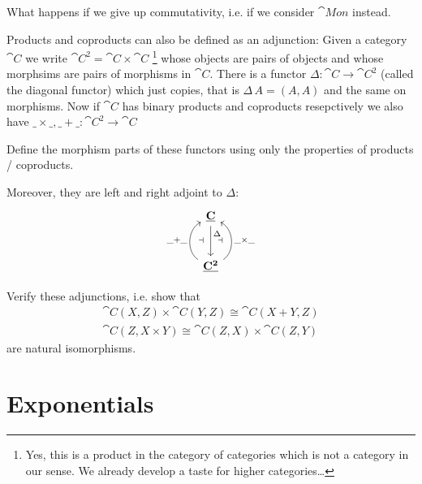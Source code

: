 \begin{question}
  What happens if we give up commutativity, i.e. if we consider $\cat{Mon}$ instead.
\end{question}

Products and coproducts can also be defined as an adjunction: Given a category $\cat{C}$ we write $\cat{C^2} = \cat{C}\times\cat{C}$
\footnote{Yes, this is a product in the category of categories which is not a category in our sense. We already develop a taste for higher categories\dots}
whose objects are pairs of objects and whose morphsims are pairs of morphisms in $\cat{C}$. There is a functor $\Delta : \cat{C} \to \cat{C^2}$ (called the diagonal functor) which just copies, that is $\Delta\,A = (A,A)$ and the same on morphisms. Now if $\cat{C}$ has binary products and coproducts resepctively we also have $\_\times\_, \_+\_ : \cat{C^2} \to \cat{C}$
\begin{Exercise}
  Define the morphism parts of these functors using only the properties of products / coproducts.
\end{Exercise}
Moreover, they are left and right adjoint to $\Delta$:
\[\begin{tikzcd}[row sep=large]
\cat{C} \arrow[d,"\Delta" near start] \\ 
\cat{C^2} \arrow[u,bend left = 60,"\_+\_" left,"\dashv" right=5 ] \arrow[u,bend right = 60,"\_\times\_" right,"\dashv" left = 5]
\end{tikzcd}\]
\begin{Exercise}
  Verify these adjunctions, i.e. show that
  \begin{align*}
    \cat{C}(X,Z) \times \cat{C}(Y,Z) \cong \cat{C}(X + Y,Z) \\
    \cat{C}(Z, X\times Y) \cong \cat{C}(Z,X) \times \cat{C}(Z,Y)
  \end{align*}
  are natural isomorphisms. 
\end{Exercise}

\section{Exponentials}
\label{sec:exponentials}

